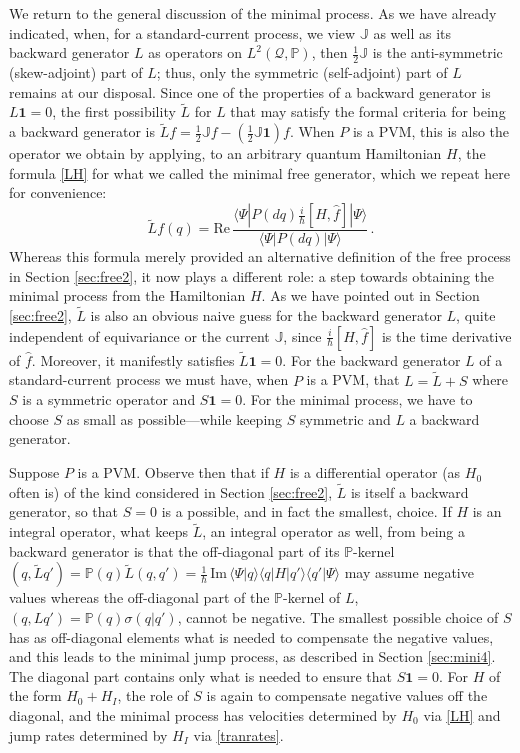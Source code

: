 \documentclass[12pt]{article}
\newcommand{\I}{i} %
\newcommand{\1}{\mathbf{1}} %
\renewcommand{\Re}{\mathrm{Re}} %
\renewcommand{\Im}{\mathrm{Im}} %
\renewcommand{\sp}[2]{\langle #1 | #2 \rangle} %
\newcommand{\conf}{\mathcal{Q}} %
\newcommand{\measure}{\mathbb{P}} %
\newcommand{\current}{\mathbb{J}}
\newcommand{\pov}{{P}}%
\newcommand{\inter}{{I}} %
\begin{document}
We return to the general discussion of the minimal process. As we have
already indicated, when, for a standard-current process, we view
$\current$ as well as its backward generator $L$ as operators on
$L^2(\conf, \measure)$, then $\frac12 \current$ is the anti-symmetric
(skew-adjoint) part of $L$; thus, only the symmetric (self-adjoint)
part of $L$ remains at our disposal.  Since one of the properties of a
backward generator   is $L\1 =0$, the first possibility $\tilde{L}$ for
$L$ that may satisfy the formal criteria for being a backward
generator is $\tilde{L} f = \frac12 \current f - (\frac12 \current
\1)f$.  When $\pov$ is a PVM, this is also the operator we obtain by
applying, to an arbitrary quantum Hamiltonian $H$, the formula
\eqref{LH} for what we called the minimal free generator, which we
repeat here for convenience:
\begin{equation}\label{Ltilde}
   \tilde{L} f(q) = \Re \, \frac{\sp{\Psi} {\pov(dq) \frac{\I}{\hbar}
   [H,\hat{f}] |\Psi}} {\sp{\Psi} {\pov(dq)|\Psi}}\,.
\end{equation}
Whereas this formula merely provided an alternative definition of the
free process in Section \ref{sec:free2}, it now plays a different
role: a step towards obtaining the minimal process from the
Hamiltonian $H$.  As we have pointed out in Section \ref{sec:free2},
$\tilde{L}$ is also an obvious naive guess for the backward generator
$L$, quite independent of equivariance or the current $\current$,
since $\frac{\I} {\hbar} [H,\hat{f}]$ is the time derivative of
$\hat{f}$. Moreover, it manifestly satisfies $\tilde{L} \1 =0$.  For
the backward generator $L$ of a standard-current process we must have,
when $\pov$ is a PVM, that $L = \tilde{L} + S$ where $S$ is a
symmetric operator and $S\1 =0$.  For the minimal process, we have to
choose $S$ as small as possible---while keeping $S$ symmetric and $L$
a backward generator.

Suppose $\pov$ is a PVM. Observe then that if $H$ is a differential
operator (as $H_0$ often is) of the kind considered in Section
\ref{sec:free2}, $\tilde{L}$ is itself a backward generator, so that
$S=0$ is a possible, and in fact the smallest, choice.  If $H$ is an
integral operator, what keeps $\tilde{L}$, an integral operator as
well, from being a backward generator is that the off-diagonal part of
its $\measure$-kernel $(q,\tilde{L} q') = \measure(q) \tilde{L}(q,q')
= \frac{1}{\hbar} \, \Im \, \sp{\Psi}{q} \sp{q}{H|q'} \sp{q'}{\Psi}$
may assume negative values whereas the off-diagonal part of the
$\measure$-kernel of $L$, $(q,Lq') = \measure(q) \sigma(q|q')$, cannot
be negative.  The smallest possible choice of $S$ has as off-diagonal
elements what is needed to compensate the negative values, and this
leads to the minimal jump process, as described in Section
\ref{sec:mini4}.  The diagonal part contains only what is needed to
ensure that $S\1 =0$.  For $H$ of the form $H_0 + H_\inter$, the role
of $S$ is again to compensate negative values off the diagonal, and
the minimal process has velocities determined by $H_0$ via \eqref{LH}
and jump rates determined by $H_\inter$ via \eqref{tranrates}.
\end{document}
